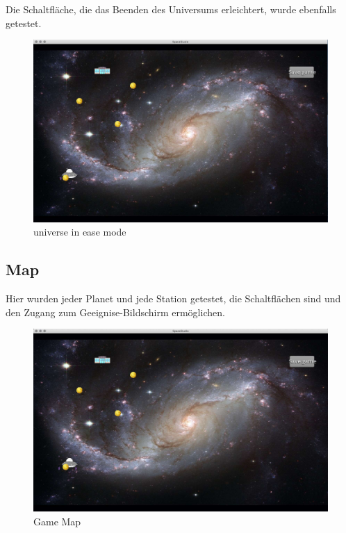 \documentclass[12pt]{article}
\begin{document}
Die Schaltfläche, die das Beenden des Universums erleichtert, wurde ebenfalls getestet.\\

\begin{figure}[t]
\centering
\includegraphics[scale=0.4]{TestProtocolBilder/universeEase.jpg}
\caption{universe in ease mode}
\end{figure}

\newpage
\subsection{Map}

Hier wurden jeder Planet und jede Station getestet, die Schaltflächen sind und den Zugang zum Geeignise-Bildschirm ermöglichen.\\
\begin{figure}
\centering
\includegraphics[scale=0.4]{TestProtocolBilder/map.jpg}
\caption{Game Map}
\end{figure}
\newpage
\end{document}
